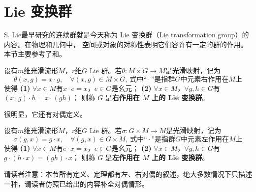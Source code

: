 
\section{ Lie 变换群}\label{chlg:sec_Lie-transformation-group}

S. Lie最早研究的连续群就是今天称为 Lie 变换群（Lie transformation group）的内容。在物理和几何中，
空间或对象的对称性表明它们容许有一定的群的作用。
本节主要参考了\parencite[\S 6.5]{chenwh2001}和\parencite[\S 9.3]{marsden-1999-IMS}。



\begin{definition}\label{chlg:def_Lie-Trans-R}
    设有$m$维光滑流形$M$，$r$维$G$ Lie 群。若$\theta:M\times G \to M$是光滑映射，记为
    \begin{equation*}
        \theta(x,g)=x\cdot g,\quad \forall(x,g)\in M\times G,
        \ \text{式中“} \cdot \text{”是指群}G\text{中元素右作用在}M \text{上}
    \end{equation*}
    使得
    {\bfseries (1)} $\forall x\in M$有$x\cdot e=x$，$e\in G$是幺元；
    {\bfseries (2)} $\forall x \in M$，$\forall g, h \in G$有$(x \cdot g) \cdot h=x \cdot(g h)$；
    则称 $G$ 是\textbf{右作用在 $M$ 上的 Lie 变换群}。
\end{definition}

很明显，它还有对偶定义。
\begin{definition}\label{chlg:def_Lie-Trans-L}
    设有$m$维光滑流形$M$，$r$维$G$ Lie 群。若$\sigma:G\times M \to M$是光滑映射，记为
    \begin{equation*}
        \sigma(g,x)=g\cdot x,\quad \forall(g,x)\in G\times M,
        \ \text{式中“} \cdot \text{”是指群}G\text{中元素左作用在}M \text{上}
    \end{equation*}
    使得
    {\bfseries (1)} $\forall x \in M$有$e\cdot x=x$，$e\in G$是幺元；
    {\bfseries (2)} $\forall x \in M$，$\forall g, h \in G$有$g\cdot (h \cdot x) =(gh)\cdot x$；
    则称 $G$ 是\textbf{左作用在 $M$ 上的 Lie 变换群}。
\end{definition}

请读者注意：本节所有定义、定理都有左、右对偶的叙述，绝大多数情况下只描述
一种，请读者仿照已给出的内容补全对偶情形。

